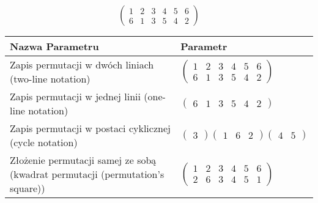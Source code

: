 \documentclass[12pt]{article}
\begin{document}
\subsection{}
\begin{center}
\[
\begin{pmatrix}
	1 & 2 & 3 & 4 & 5 & 6 \\ 
	6 & 1 & 3 & 5 & 4 & 2 
\end{pmatrix}
\]

\begin{tabular}{|m{0.6\linewidth}|m{0.4\linewidth}|}
	\hline
	Nazwa Parametru & Parametr \\
	\hline
	Zapis permutacji w dwóch liniach (two-line notation) & $\begin{pmatrix} 1 & 2 & 3 & 4 & 5 & 6 \\ 
6 & 1 & 3 & 5 & 4 & 2 \end{pmatrix}$ \\ 
	\hline
	Zapis permutacji w jednej linii (one-line notation) & $\begin{pmatrix} 6 & 1 & 3 & 5 & 4 & 2 \end{pmatrix}$ \\ 
	\hline
	Zapis permutacji w postaci cyklicznej (cycle notation) & $\begin{pmatrix} 3 \end{pmatrix} \begin{pmatrix} 1 & 6 & 2 \end{pmatrix} \begin{pmatrix} 4 & 5 \end{pmatrix} $ \\ 
	\hline
	Złożenie permutacji samej ze sobą (kwadrat permutacji (permutation's square)) & $\begin{pmatrix} 1 & 2 & 3 & 4 & 5 & 6 \\ 
2 & 6 & 3 & 4 & 5 & 1 \end{pmatrix}$ \\ 
	\hline
\end{tabular}
\end{center}
\end{document}

